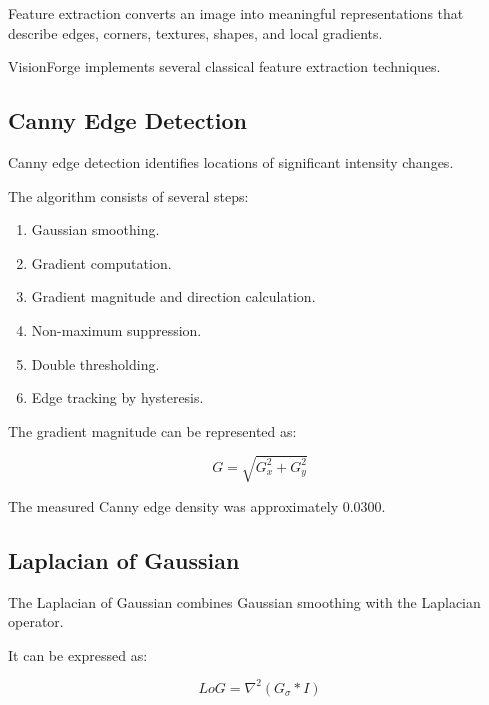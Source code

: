 \documentclass[11pt,a4paper]{article}
\begin{document}
Feature extraction converts an image into meaningful representations that describe edges, corners, textures, shapes, and local gradients.

VisionForge implements several classical feature extraction techniques.


\subsection{Canny Edge Detection}

Canny edge detection identifies locations of significant intensity changes.

The algorithm consists of several steps:

\begin{enumerate}
    \item Gaussian smoothing.
    \item Gradient computation.
    \item Gradient magnitude and direction calculation.
    \item Non-maximum suppression.
    \item Double thresholding.
    \item Edge tracking by hysteresis.
\end{enumerate}

The gradient magnitude can be represented as:

\begin{equation}
G=\sqrt{G_x^2+G_y^2}
\end{equation}

The measured Canny edge density was approximately 0.0300.


\subsection{Laplacian of Gaussian}

The Laplacian of Gaussian combines Gaussian smoothing with the Laplacian operator.

It can be expressed as:

\begin{equation}
LoG=\nabla^2(G_{\sigma}*I)
\end{equation}
\end{document}
